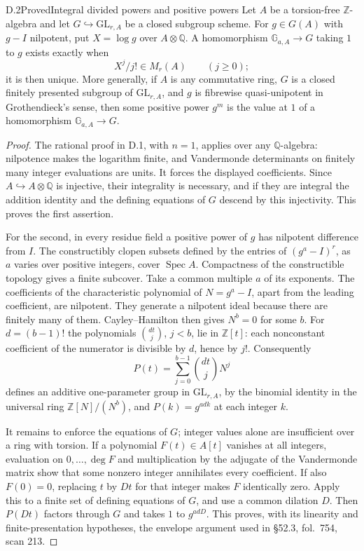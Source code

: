 \begin{statement}{D.2}{Proved}{Integral divided powers and positive powers}
Let $A$ be a torsion-free $\mathbb Z$-algebra and let
$G\hookrightarrow\mathrm{GL}_{r,A}$ be a closed subgroup scheme.
For $g\in G(A)$ with $g-I$ nilpotent, put $X=\log g$ over
$A\otimes\mathbb Q$.  A homomorphism
$\mathbb G_{a,A}\to G$ taking $1$ to $g$ exists exactly when
\[
 X^j/j!\in M_r(A)\qquad(j\geq0);
\]
it is then unique.  More generally, if $A$ is any commutative ring,
$G$ is a closed finitely presented subgroup of $\mathrm{GL}_{r,A}$,
and $g$ is fibrewise quasi-unipotent in Grothendieck's sense, then
some positive power $g^m$ is the value at $1$ of a homomorphism
$\mathbb G_{a,A}\to G$.
\end{statement}
\begin{proof}
The rational proof in D.1, with $n=1$, applies over any
$\mathbb Q$-algebra: nilpotence makes the logarithm finite, and
Vandermonde determinants on finitely many integer evaluations are
units.  It forces the displayed coefficients.  Since
$A\hookrightarrow A\otimes\mathbb Q$ is injective, their integrality
is necessary, and if they are integral the addition identity and
the defining equations of $G$ descend by this injectivity.  This
proves the first assertion.

For the second, in every residue field a positive power of $g$ has
nilpotent difference from $I$.  The constructibly clopen subsets
defined by the entries of $(g^a-I)^r$, as $a$ varies over positive
integers, cover $\operatorname{Spec}A$.  Compactness of the
constructible topology gives a finite subcover.  Take a common
multiple $a$ of its exponents.  The coefficients of the characteristic
polynomial of $N=g^a-I$, apart from the leading coefficient, are
nilpotent.  They generate a nilpotent ideal because there are finitely
many of them.  Cayley--Hamilton then gives $N^b=0$ for some $b$.
For $d=(b-1)!$ the polynomials $\binom{dt}{j}$, $j<b$, lie in
$\mathbb Z[t]$: each nonconstant coefficient of the numerator is
divisible by $d$, hence by $j!$.  Consequently
\[
 P(t)=\sum_{j=0}^{b-1}\binom{dt}{j}N^j
\]
defines an additive one-parameter group in $\mathrm{GL}_{r,A}$,
by the binomial identity in the universal ring
$\mathbb Z[N]/(N^b)$, and $P(k)=g^{adk}$ at each integer $k$.

It remains to enforce the equations of $G$; integer values alone
are insufficient over a ring with torsion.  If a polynomial
$F(t)\in A[t]$ vanishes at all integers, evaluation on
$0,\ldots,\deg F$ and multiplication by the adjugate of the
Vandermonde matrix show that some nonzero integer annihilates
every coefficient.  If also $F(0)=0$, replacing $t$ by $Dt$ for
that integer makes $F$ identically zero.  Apply this to a finite
set of defining equations of $G$, and use a common dilation $D$.
Then $P(Dt)$ factors through $G$ and takes $1$ to $g^{adD}$.
This proves, with its linearity and finite-presentation hypotheses,
the envelope argument used in \S52.3, fol.~754, scan 213.
\end{proof}

